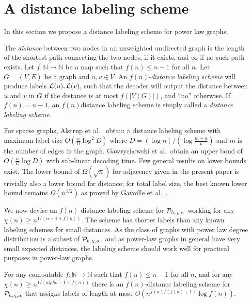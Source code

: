 \section{A distance labeling scheme}\label{Sec:Distance}
In this section we propose a distance labeling scheme for power law graphs. 

The \emph{distance} between two nodes in an unweighted undirected graph is the length of the shortest path connecting
the two nodes, if it exists, and $\infty$ if no such path exists. Let $f : \mathbb{N} \longrightarrow \mathbb{N}$ be a map such that
$f(n) \leq  n -1$ for all $n$.
Let $G=(V,E)$ be a graph and  $u,v \in V$.
An $f(n)$-\emph{distance labeling scheme}  will produce labels $ \mathcal{L}(u), \mathcal{L}(v)$, such that the decoder will output the distance between $u$ and $v$ in $G$ if the distance is at most $f(\vert V(G) \vert)$, and ``no'' otherwise. 
If $f(n) = n-1$, an $f(n)$distance labeling scheme is simply called a \emph{distance labeling scheme}.

For sparse graphs,
Alstrup et al.\ \cite{DBLP:journals/corr/AlstrupDKP15} obtain a distance labeling scheme with maximum label size
$O(\frac{n}{D} \log^2 D)$ where $D = (\log n)/(\log \frac{m+n}{n})$ and $m$ is the number of edges
in the graph.   Gawrychowski et al.\ obtain an upper bond of \cite{DBLP:journals/corr/GawrychowskiKU15}
$O(\frac{n}{D} \log D)$ with sub-linear decoding time. Few general results on lower bounds exist. The lower bound of $\Omega(\sqrt{n})$ for adjacency given in the present paper is trivially also a lower bound for distance; for total label size, the best known lower bound remains $\Omega(n^{3/2})$ as proved by Gavoille et al.~\cite{Gavoille2001}.

We now devise an $f(n)$-distance labeling scheme for $ \mathcal{P}_{h,\chi,\alpha}$ working for any $\chi(n) \geq n^{1/(\alpha - 1 +f(n))}$.
The scheme has shorter labels than any known labeling schemes for small distances. As
the class of graphs with power law degree distribution is a subset of $ \mathcal{P}_{h,\chi,\alpha}$, and as power-law graphs in general
have very small expected distances, the labeling scheme should work well for practical purposes in power-law graphs.

\begin{lemma}\label{lem:sparse_small_dist}
For any computable $f : \mathbb{N} \longrightarrow \mathbb{N}$ such that
$f(n) \leq n -1$ for all $n$, and for any $\chi(n) \geq n^{1/(alpha-1+f(n))}$ there is an $f(n)$-distance labeling scheme for $ \mathcal{P}_{h,\chi,\alpha}$
that assigns labels of length at most $O(n^{f(n)/(f(n) + 1)} \log f(n))$.
\end{lemma}


